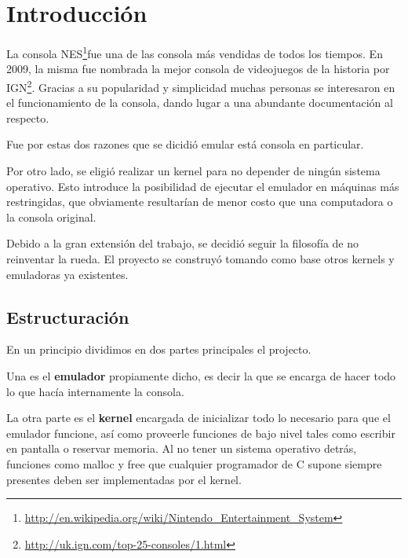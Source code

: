 \chapter{Introducción}
La consola NES\footnote{\url{http://en.wikipedia.org/wiki/Nintendo_Entertainment_System}}fue una de las consola más vendidas de todos los tiempos. En 2009, la misma fue nombrada la mejor consola de videojuegos de la historia por IGN\footnote{\url{http://uk.ign.com/top-25-consoles/1.html}}.
Gracias a su popularidad y simplicidad muchas personas se interesaron en el funcionamiento de la consola, dando lugar a una abundante documentación al respecto.

Fue por estas dos razones que se dicidió emular está consola en particular.

Por otro lado, se eligió realizar un kernel para no depender de ningún sistema operativo. Esto introduce la posibilidad de ejecutar el emulador en máquinas más restringidas, que obviamente resultarían de menor costo que una computadora o la consola original.

Debido a la gran extensión del trabajo, se decidió seguir la filosofía de no reinventar la rueda. El proyecto se construyó tomando como base otros kernels y emuladoras ya existentes.

\section{Estructuración}

En un principio dividimos en dos partes principales el projecto.

Una es el \textbf{emulador} propiamente dicho, es decir la que se encarga de hacer todo lo que hacía internamente la consola.

La otra parte es el \textbf{kernel} encargada de inicializar todo lo necesario para que el emulador funcione, así como proveerle funciones de bajo nivel tales como escribir en pantalla o reservar memoria. Al no tener un sistema operativo detrás, funciones como malloc y free que cualquier programador de C supone siempre presentes deben ser implementadas por el kernel.
